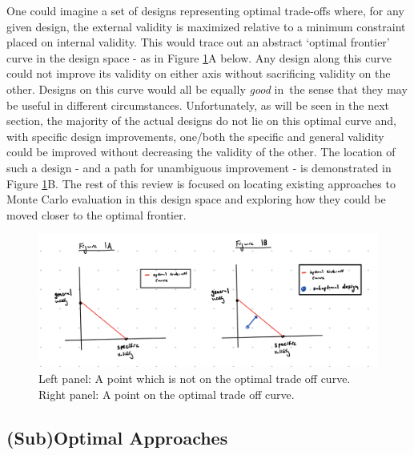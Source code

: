 \documentclass[../main.tex]{subfiles}
\begin{document}
\vspace{\baselineskip}
One could imagine a set of designs representing optimal trade-offs where, for any given design, the external validity is maximized relative to a minimum constraint placed on internal validity. This would trace out an abstract ‘optimal frontier’ curve in the design space - as in Figure \ref{fig:optimal_tradeoff_curve}A below. Any design along this curve could not improve its validity on either axis without sacrificing validity on the other. Designs on this curve would all be equally \textit{good }in\ the sense that they may be useful in different circumstances. Unfortunately, as will be seen in the next section, the majority of the actual designs do not lie on this optimal curve and, with specific design improvements, one/both the specific and general validity could be improved without decreasing the validity of the other. The location of such a design - and a path for unambiguous improvement  - is demonstrated in Figure \ref{fig:optimal_tradeoff_curve}B. The rest of this review is focused on locating existing approaches to Monte Carlo evaluation in this design space and exploring how they could be moved closer to the optimal frontier.\par


\vspace{\baselineskip}

\begin{figure}[ht!]
    \centering
    \includegraphics[width=0.9\linewidth]{figures/ch4-optimal-tradeoff-curve.png}
    \caption{Left panel: A point which is not on the optimal trade off curve. Right panel: A point on the optimal trade off curve.}
    \label{fig:optimal_tradeoff_curve}
\end{figure}

\par

\vspace{\baselineskip}

\subsection{(Sub)Optimal Approaches}
\end{document}
